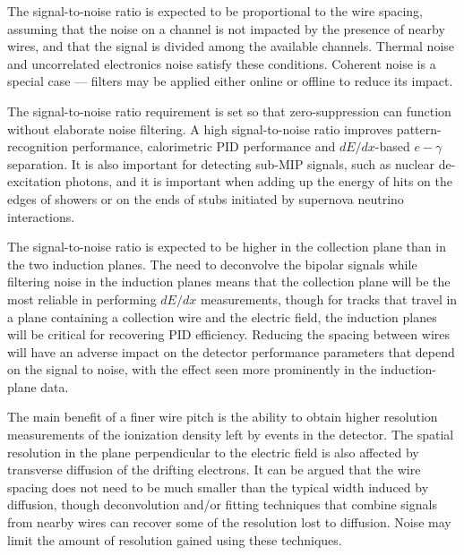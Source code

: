 The signal-to-noise ratio is expected to be proportional to the wire
spacing, assuming that the noise on a channel is not impacted by the
presence of nearby wires, and that the signal is divided among the
available channels.  Thermal noise and uncorrelated electronics noise
satisfy these conditions.  Coherent noise is a special case ---
filters may be applied either online or offline to reduce its impact.

The signal-to-noise ratio requirement is set so that zero-suppression
can function without elaborate noise filtering.  A high
signal-to-noise ratio improves pattern-recognition performance,
calorimetric PID performance and $dE/dx$-based $e-\gamma$ separation.
It is also important for detecting sub-MIP signals, such as nuclear
de-excitation photons, and it is important when adding up the energy
of hits on the edges of showers or on the ends of stubs initiated by
supernova neutrino interactions.

The signal-to-noise ratio is expected to be higher in the collection
plane than in the two induction planes.  The need to deconvolve the
bipolar signals while filtering noise in the induction planes means
that the collection plane will be the most reliable in performing
$dE/dx$ measurements, though for tracks that travel in a plane
containing a collection wire and the electric field, the induction
planes will be critical for recovering PID efficiency.  Reducing the
spacing between wires will have an adverse impact on the detector
performance parameters that depend on the signal to noise, with the
effect seen more prominently in the induction-plane data.

The main benefit of a finer wire pitch is the ability to obtain higher
resolution measurements of the ionization density left by events in
the detector.  The spatial resolution in the plane perpendicular to
the electric field is also affected by transverse diffusion of the
drifting electrons.  It can be argued that the wire spacing does not
need to be much smaller than the typical width induced by diffusion,
though deconvolution and/or fitting techniques that combine signals
from nearby wires can recover some of the resolution lost to
diffusion.  Noise may limit the amount of resolution gained using
these techniques.

